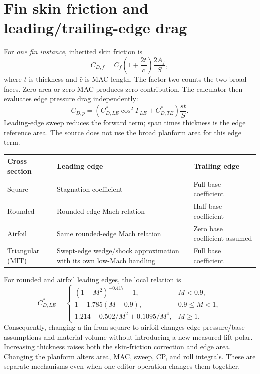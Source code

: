 \section{Fin skin friction and leading/trailing-edge drag}\label{sec:fin-drag}
For \emph{one fin instance}, inherited skin friction is
\begin{equation}
C_{D,f}=C_f\left(1+\frac{2t}{\bar c}\right)\frac{2A_f}{S},
\end{equation}
where $t$ is thickness and $\bar c$ is MAC length. The factor two counts the two broad faces. Zero area or zero MAC produces zero contribution. The calculator then evaluates edge pressure drag independently:
\begin{equation}
C_{D,p}=\left(C_{D,LE}^{*}\cos^2\Gamma_{LE}+C_{D,TE}^{*}\right)\frac{st}{S}.
\end{equation}
Leading-edge sweep reduces the forward term; span times thickness is the edge reference area. The source does not use the broad planform area for this edge term.

\begin{tabularx}{\linewidth}{@{}L{3cm}YY@{}}\toprule
Cross section & Leading edge & Trailing edge\\\midrule
Square & Stagnation coefficient & Full base coefficient\\
Rounded & Rounded-edge Mach relation & Half base coefficient\\
Airfoil & Same rounded-edge Mach relation & Zero base coefficient assumed\\
Triangular (MIT) & Swept-edge wedge/shock approximation with its own low-Mach handling & Full base coefficient\\\bottomrule
\end{tabularx}

For rounded and airfoil leading edges, the local relation is
\begin{equation}
C_{D,LE}^{*}=\begin{cases}
(1-M^2)^{-0.417}-1,&M<0.9,\\
1-1.785(M-0.9),&0.9\leq M<1,\\
1.214-0.502/M^2+0.1095/M^4,&M\geq1.
\end{cases}
\end{equation}
Consequently, changing a fin from square to airfoil changes edge pressure/base assumptions and material volume without introducing a new measured lift polar. Increasing thickness raises both the skin-friction correction and edge area. Changing the planform alters area, MAC, sweep, CP, and roll integrals. These are separate mechanisms even when one editor operation changes them together.


